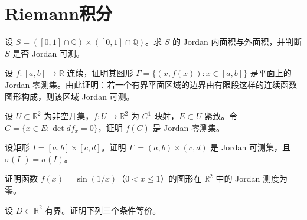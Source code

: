 \renewcommand{\thesection}{\arabic{section}}\renewcommand{\theHsection}{chapter.\arabic{section}}\setcounter{section}{17}\section{Riemann积分}
\noindent\begin{minipage}{\textwidth}
设 $S=([0,1]\cap\mathbb Q)\times([0,1]\cap\mathbb Q)$。求 $S$ 的 Jordan 内面积与外面积，并判断 $S$ 是否 Jordan 可测。
\end{minipage}\par\vfill
\noindent\begin{minipage}{\textwidth}
设 $f:[a,b]\to\mathbb R$ 连续，证明其图形 $\Gamma=\{(x,f(x)):x\in[a,b]\}$ 是平面上的 Jordan 零测集。由此证明：若一个有界平面区域的边界由有限段这样的连续函数图形构成，则该区域 Jordan 可测。
\end{minipage}\par\vfill
\noindent\begin{minipage}{\textwidth}
设 $U\subset\mathbb R^2$ 为非空开集，$f:U\to\mathbb R^2$ 为 $C^1$ 映射，$E\subset U$ 紧致。令 $C=\{x\in E:\det df_x=0\}$，证明 $f(C)$ 是 Jordan 零测集。
\end{minipage}\par\vfill
\noindent\begin{minipage}{\textwidth}
设矩形 $I=[a,b]\times[c,d]$。证明 $I^\circ=(a,b)\times(c,d)$ 是 Jordan 可测集，且 $\sigma(I^\circ)=\sigma(I)$。
\end{minipage}\par\vfill
\newpage
\noindent\begin{minipage}{\textwidth}
证明函数 $f(x)=\sin(1/x)$（$0<x\le1$）的图形在 $\mathbb R^2$ 中的 Jordan 测度为零。
\end{minipage}\par\vfill
\noindent\begin{minipage}{\textwidth}
设 $D\subset\mathbb R^2$ 有界。证明下列三个条件等价。
\end{minipage}\par\vfill
